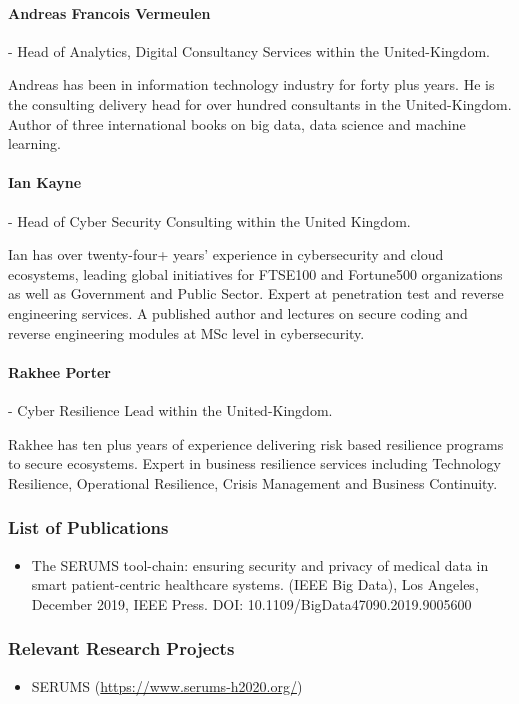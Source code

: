 \documentclass[a4paper,11pt]{article}
\begin{document}
\vspace{10pt}

\paragraph{Andreas Francois Vermeulen} - Head of Analytics, Digital Consultancy Services within the United-Kingdom.

Andreas has been in information technology industry for forty plus years. He is the consulting delivery head for over hundred consultants in the United-Kingdom. Author of three international books on big data, data science and machine learning.

\paragraph{Ian Kayne} - Head of Cyber Security Consulting within the United Kingdom.

Ian has over twenty-four+ years’ experience in cybersecurity and cloud ecosystems, leading global initiatives for FTSE100 and Fortune500 organizations as well as Government and Public Sector. Expert at penetration test and reverse engineering services. A published author and lectures on secure coding and reverse engineering modules at MSc level in cybersecurity.


\paragraph{Rakhee Porter} - Cyber Resilience Lead within the United-Kingdom.

Rakhee has ten plus years of experience delivering risk based resilience programs to secure ecosystems. Expert in business resilience services including Technology Resilience, Operational Resilience, Crisis Management and Business Continuity.

\subsubsection*{List of Publications}

\begin{itemize}
\item The SERUMS tool-chain: ensuring security and privacy of medical data in smart patient-centric healthcare systems. (IEEE Big Data), Los Angeles, December 2019, IEEE Press. DOI: 10.1109/BigData47090.2019.9005600
\end{itemize}

\subsubsection*{Relevant Research Projects}
\begin{itemize}
\item SERUMS (\url{https://www.serums-h2020.org/})
\end{itemize}
\end{document}
